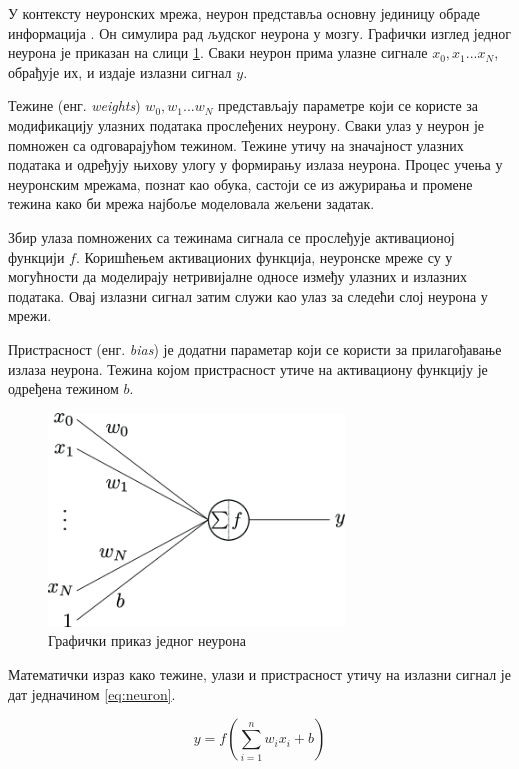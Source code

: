 \documentclass[a4paper, 12pt, master, utf8]{etf}
\begin{document}
У контексту неуронских мрежа, неурон представља основну јединицу обраде информација \cite{noauthor_artificial_20233}. 
Он симулира рад људског неурона у мозгу. Графички изглед једног неурона је приказан на слици \ref{fig:neuron}. 
Сваки неурон прима улазне сигнале $x_0, x_1 ... x_N$, обрађује их, и издаје излазни сигнал $y$.

Тежине (енг. \textit{weights}) $w_0, w_1 ... w_N$ представљају параметре који се користе за модификацију улазних података прослеђених неурону. 
Сваки улаз у неурон је помножен са одговарајућом тежином. Тежине утичу на значајност улазних података и одређују њихову улогу у формирању излаза неурона. 
Процес учења у неуронским мрежама, познат као обука, састоји се из ажурирања и промене тежина како би мрежа најбоље моделовала жељени задатак.

Збир улаза помножених са тежинама сигнала се прослеђује активационој функцији $f$. 
Коришћењем активационих функција, неуронске мреже су у могућности да моделирају нетривијалне односе између улазних и излазних података. 
Овај излазни сигнал затим служи као улаз за следећи слој неурона у мрежи.

Пристрасност (енг. \textit{bias}) је додатни параметар који се користи за прилагођавање излаза неурона. 
Тежина којом пристрасност утиче на активациону функцију је одређена тежином $b$.

\begin{figure}[h]
    \centering
    \includegraphics[width=0.7\textwidth]{images/neuron.png}
    \caption{Графички приказ једног неурона \cite{ioannou_structural_2017}}
    \label{fig:neuron}
\end{figure}

Математички израз како тежине, улази и пристрасност утичу на излазни сигнал је дат једначином \ref{eq:neuron}.

\begin{equation}
    y = f\left(\sum_{i=1}^{n} w_i x_i + b\right)
    \label{eq:neuron}
\end{equation}
\end{document}
